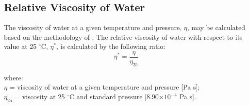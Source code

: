 \documentclass{myreport}
\begin{document}
\subsection{Relative Viscosity of Water}
\label{sec:eta}
The viscosity of water at a given temperature and pressure, $\eta$, may be calculated based on the methodology of \cite{huber09}. 
The relative viscosity of water with respect to its value at 25 ${}^\circ$C, $\eta^\ast$, is calculated by the following ratio:
%
\begin{equation}
\label{eq:ns}
    \eta^\ast = \frac{\eta}{\eta_{25}}
\end{equation}

\noindent where:\\
\indent $\eta$ = viscosity of water at a given temperature and pressure [Pa s];\\
\indent $\eta_{25}$ = viscosity at 25 ${}^\circ$C and standard pressure [8.90$\times 10^{-4}$ Pa s].\\

\end{document}
